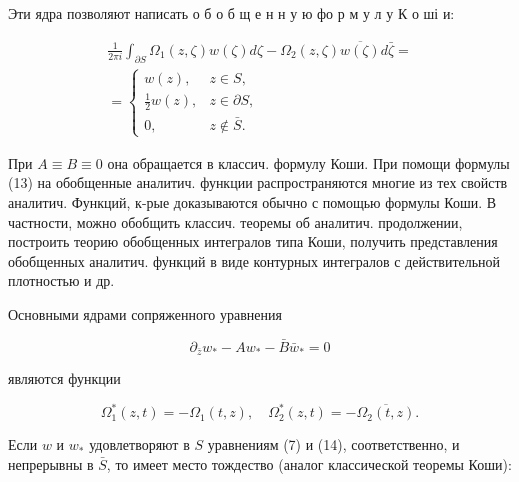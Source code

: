 \documentclass[10pt]{article}
\begin{document}
Эти ядра позволяют написать о б о б щ е н н у ю фо р м у л у К о ші и:



\[

\begin{gathered}

\frac{1}{2 \pi i} \int_{\partial S} \Omega_{1}(z, \zeta) w(\zeta) d \zeta-\Omega_{2}(z, \zeta) \overline{w(\zeta)} d \bar{\zeta}= \\

= \begin{cases}w(z), & z \in S, \\

\frac{1}{2} w(z), & z \in \partial S, \\

0, & z \notin \bar{S} .\end{cases}

\end{gathered}

\]



При $A \equiv B \equiv 0$ она обращается в классич. формулу Коши. При помощи формулы (13) на обобщенные аналитич. функции распространяются многие из тех свойств аналитич. Функций, к-рые доказываются обычно с помощью формулы Коши. В частности, можно обобщить классич. теоремы об аналитич. продолжении, построить теорию обобщенных интегралов типа Коши, получить представления обобщенных аналитич. функций в виде контурных интегралов с действительной плотностью и др.



Основными ядрами сопряженного уравнения



\[

\partial_{\bar{z}} w_{*}-A w_{*}-\bar{B} \bar{w}_{*}=0

\]



являются функции



\[

\Omega_{1}^{*}(z, t)=-\Omega_{1}(t, z), \quad \Omega_{2}^{*}(z, t)=-\overline{\Omega_{2}(t, z)} .

\]



Если $w$ и $w_{*}$ удовлетворяют в $S$ уравнениям (7) и (14), соответственно, и непрерывны в $\bar{S}$, то имеет место тождество (аналог классической теоремы Коши):
\end{document}
